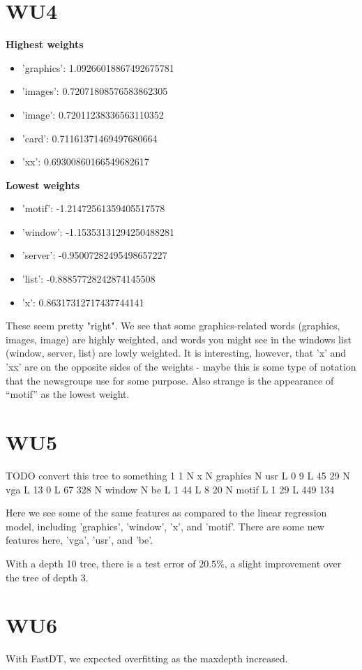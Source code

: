 \section{WU4}
    \textbf{Highest weights}
    \begin{itemize}
        \item 'graphics': 1.09266018867492675781
        \item 'images': 0.72071808576583862305
        \item 'image': 0.72011238336563110352
        \item 'card': 0.71161371469497680664
        \item 'xx': 0.69300860166549682617
    \end{itemize}

    \textbf{Lowest weights}
    \begin{itemize}
        \item 'motif': -1.21472561359405517578
        \item 'window': -1.15353131294250488281
        \item 'server': -0.95007282495498657227
        \item 'list': -0.88857728242874145508
        \item 'x': 0.86317312717437744141
    \end{itemize}

    These seem pretty "right". We see that some graphics-related words (graphics, images, image) are highly weighted, and words you might see in the windows list (window, server, list) are lowly weighted. It is interesting, however, that 'x' and 'xx' are on the opposite sides of the weights - maybe this is some type of notation that the newsgroups use for some purpose. Also strange is the appearance of ``motif'' as the lowest weight.
\section{WU5}
TODO convert this tree to something
1
1
N x
N graphics
N usr
L 0 9
L 45 29
N vga
L 13 0
L 67 328
N window
N be
L 1 44
L 8 20
N motif
L 1 29
L 449 134

Here we see some of the same features as compared to the linear regression model, including 'graphics', 'window', 'x', and 'motif'. There are some new features here, 'vga', 'usr', and 'be'.

With a depth 10 tree, there is a test error of $20.5\%$, a slight improvement over the tree of depth 3.

\section{WU6}
    With FastDT, we expected overfitting as the maxdepth increased. 

